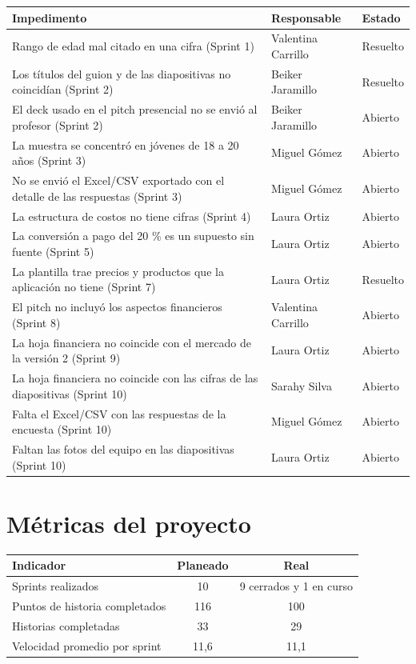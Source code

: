 \documentclass[11pt,a4paper]{article}
\begin{document}
\begin{tabularx}{\textwidth}{X l l}
  \toprule
  \textbf{Impedimento} & \textbf{Responsable} & \textbf{Estado} \\
  \midrule
  Rango de edad mal citado en una cifra (Sprint 1) & Valentina Carrillo & Resuelto \\
  Los títulos del guion y de las diapositivas no coincidían (Sprint 2) & Beiker Jaramillo & Resuelto \\
  El deck usado en el pitch presencial no se envió al profesor (Sprint 2) & Beiker Jaramillo & Abierto \\
  La muestra se concentró en jóvenes de 18 a 20 años (Sprint 3) & Miguel Gómez & Abierto \\
  No se envió el Excel/CSV exportado con el detalle de las respuestas (Sprint 3) & Miguel Gómez & Abierto \\
  La estructura de costos no tiene cifras (Sprint 4) & Laura Ortiz & Abierto \\
  La conversión a pago del 20 \% es un supuesto sin fuente (Sprint 5) & Laura Ortiz & Abierto \\
  La plantilla trae precios y productos que la aplicación no tiene (Sprint 7) & Laura Ortiz & Resuelto \\
  El pitch no incluyó los aspectos financieros (Sprint 8) & Valentina Carrillo & Abierto \\
  La hoja financiera no coincide con el mercado de la versión 2 (Sprint 9) & Laura Ortiz & Abierto \\
  La hoja financiera no coincide con las cifras de las diapositivas (Sprint 10) & Sarahy Silva & Abierto \\
  Falta el Excel/CSV con las respuestas de la encuesta (Sprint 10) & Miguel Gómez & Abierto \\
  Faltan las fotos del equipo en las diapositivas (Sprint 10) & Laura Ortiz & Abierto \\
  \bottomrule
\end{tabularx}

\section{Métricas del proyecto}

\begin{tabularx}{\textwidth}{X c c}
  \toprule
  \textbf{Indicador} & \textbf{Planeado} & \textbf{Real} \\
  \midrule
  Sprints realizados              & 10 & 9 cerrados y 1 en curso \\
  Puntos de historia completados  & 116 & 100 \\
  Historias completadas           & 33 & 29 \\
  Velocidad promedio por sprint   & 11,6 & 11,1 \\
  \bottomrule
\end{tabularx}
\end{document}
